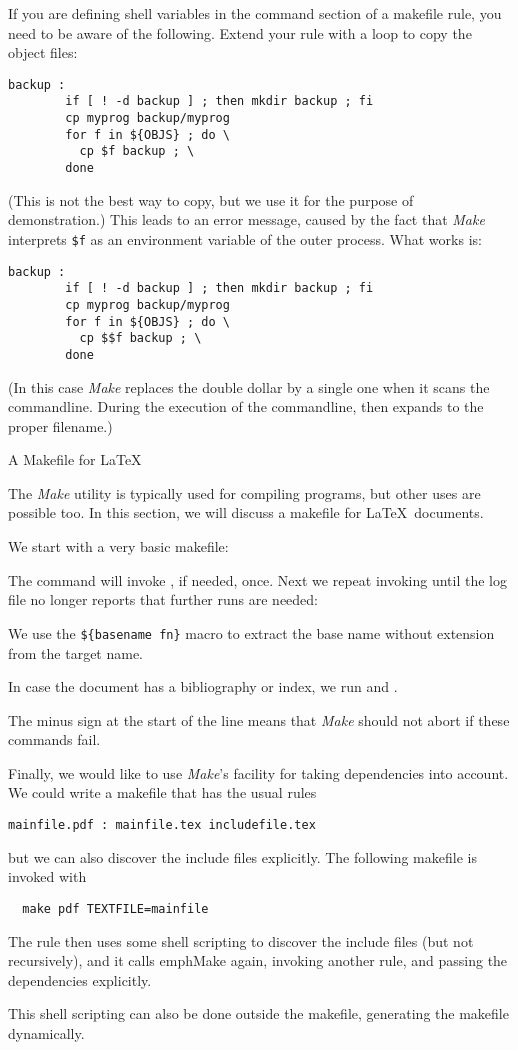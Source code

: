 If you are defining shell variables in the command section of a
makefile rule, you need to be aware of the following. Extend your
 rule with a loop to copy the object files:
\begin{verbatim}
backup :
        if [ ! -d backup ] ; then mkdir backup ; fi
        cp myprog backup/myprog
        for f in ${OBJS} ; do \
          cp $f backup ; \
        done
\end{verbatim}
(This is not the best way to copy, but we use it for the purpose of
demonstration.) This leads to an error message, caused by the fact
that \emph{Make} interprets \verb+$f+ as an environment variable of
the outer process. What works is:
\begin{verbatim}
backup :
        if [ ! -d backup ] ; then mkdir backup ; fi
        cp myprog backup/myprog
        for f in ${OBJS} ; do \
          cp $$f backup ; \
        done
\end{verbatim}
(In this case \emph{Make} replaces the double dollar by a single one
when it scans the commandline. During the execution of the
commandline,  then expands to the proper filename.)

\Level 0 {A Makefile for \LaTeX}
\label{sec:latex-make}

The \emph{Make} utility is typically used for compiling programs, but
other uses are possible too. In this section, we will discuss a
makefile for \LaTeX\ documents.

We start with a very basic makefile:

The command \n{make myfile.pdf} will invoke ,
if needed, once. Next we repeat invoking  until the log file no
longer reports that further runs are needed:

We use the \verb+${basename fn}+ macro to extract the base name
without extension from the target name.

In case the document has a bibliography or index, we run 
and \n{makeindex}. 

The minus sign at the start of the line means that
\emph{Make} should not abort if these commands fail.

Finally, we would like to use \emph{Make}'s facility for taking
dependencies into account. 
We could write a makefile that has
the usual rules
\begin{verbatim}
mainfile.pdf : mainfile.tex includefile.tex
\end{verbatim}
but we can also discover the include files explicitly. The following
makefile is invoked with 
\begin{verbatim}
  make pdf TEXTFILE=mainfile
\end{verbatim}
The \n{pdf} rule then uses some shell scripting to discover the
include files (but not recursively), and it calls emph{Make} again,
invoking another rule, and passing the dependencies explicitly.

This shell scripting can also be done outside the makefile, generating
the makefile dynamically.

